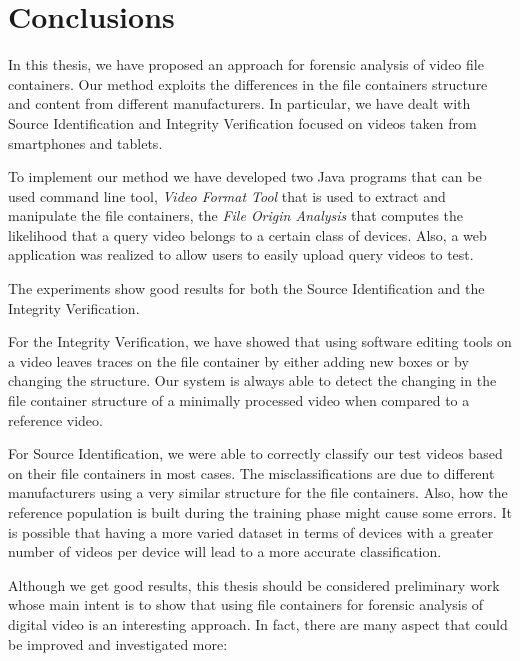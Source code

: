 \chapter*{Conclusions}

In this thesis, we have proposed an approach for forensic analysis of video file containers. Our method exploits the differences in the file containers structure and content from different manufacturers. In particular, we have dealt with Source Identification and Integrity Verification focused on videos taken from smartphones and tablets.

To implement our method we have developed two Java programs that can be used command line tool, \emph{Video Format Tool} that is used to extract and manipulate the file containers, the \emph{File Origin Analysis} that computes the likelihood that a query video belongs to a certain class of devices. Also, a web application was realized to allow users to easily upload query videos to test.

The experiments show good results for both the Source Identification and the Integrity Verification.

For the Integrity Verification, we have showed that using software editing tools on a video leaves traces on the file container by either adding new boxes or by changing the structure. Our system is always able to detect the changing in the file container structure of a minimally processed video when compared to a reference video. 

For Source Identification, we were able to correctly classify our test videos based on their file containers in most cases. The misclassifications are due to different manufacturers using a very similar structure for the file containers. Also, how the reference population is built during the training phase might cause some errors. It is possible that having a more varied dataset in terms of devices with a greater number of videos per device will lead to a more accurate classification.

Although we get good results, this thesis should be considered preliminary work whose main intent is to show that using file containers for forensic analysis of digital video is an interesting approach. In fact, there are many aspect that could be improved and investigated more:

